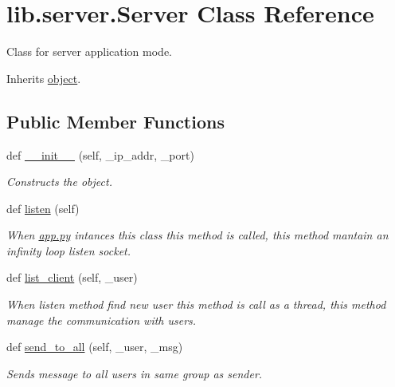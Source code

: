 \hypertarget{classlib_1_1server_1_1_server}{}\section{lib.\+server.\+Server Class Reference}
\label{classlib_1_1server_1_1_server}


Class for server application mode.  




Inherits \hyperlink{classobject}{object}.

\subsection*{Public Member Functions}
\begin{DoxyCompactItemize}
\item 
def \hyperlink{classlib_1_1server_1_1_server_a05e389feb6781a562e7be339b262f225}{\+\_\+\+\_\+init\+\_\+\+\_\+} (self, \+\_\+ip\+\_\+addr, \+\_\+port)
\begin{DoxyCompactList}\small\item\em Constructs the object. \end{DoxyCompactList}\item 
def \hyperlink{classlib_1_1server_1_1_server_a1d5cf3d4cb594c5b45c1153e2519158a}{listen} (self)
\begin{DoxyCompactList}\small\item\em When \hyperlink{app_8py}{app.\+py} intances this class this method is called, this method mantain an infinity loop listen socket. \end{DoxyCompactList}\item 
def \hyperlink{classlib_1_1server_1_1_server_a54bcf5eef81698eb45cb3159e19920f5}{list\+\_\+client} (self, \+\_\+user)
\begin{DoxyCompactList}\small\item\em When listen method find new user this method is call as a thread, this method manage the communication with users. \end{DoxyCompactList}\item 
def \hyperlink{classlib_1_1server_1_1_server_a0b25ac2782ce4491215f954a5d40217d}{send\+\_\+to\+\_\+all} (self, \+\_\+user, \+\_\+msg)
\begin{DoxyCompactList}\small\item\em Sends message to all users in same group as sender. \end{DoxyCompactList}\item 

\end{DoxyCompactItemize}
